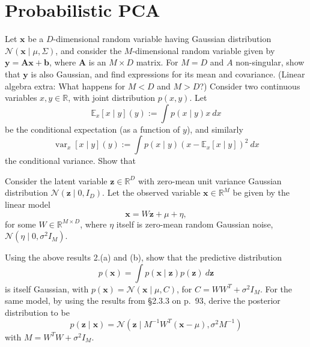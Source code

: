 \documentclass[11pt,noanswers,addpoints]{exam}
\DeclareMathOperator{\var}{var}
\newcommand{\E}{\mathbb E}
\newcommand{\R}{\mathbb R}
\newcommand{\A}{\mathbf A}
\newcommand{\x}{\mathbf x}
\newcommand{\y}{\mathbf y}
\renewcommand{\b}{\mathbf b}
\newcommand{\N}{\mathcal N}
\begin{document}
\section{Probabilistic PCA}
\begin{questions}
\question Let $\x$ be a $D$-dimensional random variable having Gaussian distribution $\N(\x\mid\mu,\Sigma)$, and consider the $M$-dimensional random variable given by $\y=\A\x+\b$, where $\A$ is an $M\times D$ matrix. For $M=D$ and $A$ non-singular, show that $\y$ is also Gaussian, and find expressions for its mean and covariance. (Linear algebra extra: What happens for $M<D$ and $M>D$?)
\question Consider two continuous variables $x,y\in \R$, with joint distribution $p(x,y)$. Let $$\E_x[x\mid y](y):=\int p(x\mid y)x\ dx$$ be the conditional expectation (as a function of $y$), and similarly $$\var_x[x\mid y](y):=\int p(x\mid y)(x-\E_x[x\mid y])^2\ dx$$ the conditional variance. Show that
\question Consider the latent variable $\mathbf z\in\R^D$ with zero-mean unit variance Gaussian distribution $\N(\mathbf z\mid 0,I_D)$. Let the observed variable $\x\in\R^M$ be given by the linear model $$\x=W\mathbf z+\mu+\eta,$$ for some $W\in\R^{M\times D}$, where $\eta$ itself is zero-mean random Gaussian noise, $\N(\eta\mid 0,\sigma^2I_M)$. 

Using the above results 2.(a) and (b), show that the predictive distribution $$p(\x)=\int p(\x\mid \mathbf z)p(\mathbf z)\ d\mathbf z$$ is itself Gaussian, with $p(\x)=\N(\x\mid \mu,C)$, for $C=WW^T+\sigma^2I_M$.
\question For the same model, by using the results from \S2.3.3 on p.~93, derive the posterior distribution to be
$$p(\mathbf z\mid \x)=\N(\mathbf z\mid M^{-1}W^T(\x-\mu),\sigma^2M^{-1})$$
with $M=W^TW+\sigma^2I_M$.
\end{questions}
\end{document}
